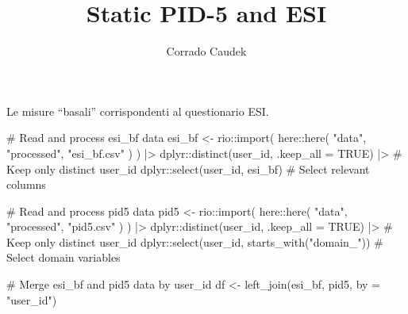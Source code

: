 \documentclass[
  11pt,
  a4paper,
  onecolumn]{article}
\title{Static PID-5 and ESI}
\author{Corrado Caudek}
\date{}
\newenvironment{Shaded}{}{}
\newcommand{\AttributeTok}[1]{\textcolor[rgb]{0.84,0.23,0.29}{#1}}
\newcommand{\CommentTok}[1]{\textcolor[rgb]{0.42,0.45,0.49}{#1}}
\newcommand{\ConstantTok}[1]{\textcolor[rgb]{0.00,0.36,0.77}{#1}}
\newcommand{\FunctionTok}[1]{\textcolor[rgb]{0.44,0.26,0.76}{#1}}
\newcommand{\NormalTok}[1]{\textcolor[rgb]{0.14,0.16,0.18}{#1}}
\newcommand{\OtherTok}[1]{\textcolor[rgb]{0.44,0.26,0.76}{#1}}
\newcommand{\SpecialCharTok}[1]{\textcolor[rgb]{0.00,0.36,0.77}{#1}}
\newcommand{\StringTok}[1]{\textcolor[rgb]{0.01,0.18,0.38}{#1}}
\begin{document}
\maketitle


Le misure ``basali'' corrispondenti al questionario ESI.

\begin{Shaded}
\begin{Highlighting}[]
\CommentTok{\# Read and process \textquotesingle{}esi\_bf\textquotesingle{} data}
\NormalTok{esi\_bf }\OtherTok{\textless{}{-}}\NormalTok{ rio}\SpecialCharTok{::}\FunctionTok{import}\NormalTok{(}
\NormalTok{  here}\SpecialCharTok{::}\FunctionTok{here}\NormalTok{(}
    \StringTok{"data"}\NormalTok{,}
    \StringTok{"processed"}\NormalTok{,}
    \StringTok{"esi\_bf.csv"}
\NormalTok{  )}
\NormalTok{) }\SpecialCharTok{|\textgreater{}}
\NormalTok{  dplyr}\SpecialCharTok{::}\FunctionTok{distinct}\NormalTok{(user\_id, }\AttributeTok{.keep\_all =} \ConstantTok{TRUE}\NormalTok{) }\SpecialCharTok{|\textgreater{}} \CommentTok{\# Keep only distinct user\_id}
\NormalTok{  dplyr}\SpecialCharTok{::}\FunctionTok{select}\NormalTok{(user\_id, esi\_bf) }\CommentTok{\# Select relevant columns}
\end{Highlighting}
\end{Shaded}

\begin{Shaded}
\begin{Highlighting}[]
\CommentTok{\# Read and process \textquotesingle{}pid5\textquotesingle{} data}
\NormalTok{pid5 }\OtherTok{\textless{}{-}}\NormalTok{ rio}\SpecialCharTok{::}\FunctionTok{import}\NormalTok{(}
\NormalTok{  here}\SpecialCharTok{::}\FunctionTok{here}\NormalTok{(}
    \StringTok{"data"}\NormalTok{,}
    \StringTok{"processed"}\NormalTok{,}
    \StringTok{"pid5.csv"}
\NormalTok{  )}
\NormalTok{) }\SpecialCharTok{|\textgreater{}}
\NormalTok{  dplyr}\SpecialCharTok{::}\FunctionTok{distinct}\NormalTok{(user\_id, }\AttributeTok{.keep\_all =} \ConstantTok{TRUE}\NormalTok{) }\SpecialCharTok{|\textgreater{}}  \CommentTok{\# Keep only distinct user\_id}
\NormalTok{  dplyr}\SpecialCharTok{::}\FunctionTok{select}\NormalTok{(user\_id, }\FunctionTok{starts\_with}\NormalTok{(}\StringTok{"domain\_"}\NormalTok{)) }\CommentTok{\# Select domain variables}

\CommentTok{\# Merge \textquotesingle{}esi\_bf\textquotesingle{} and \textquotesingle{}pid5\textquotesingle{} data by user\_id}
\NormalTok{df }\OtherTok{\textless{}{-}} \FunctionTok{left\_join}\NormalTok{(esi\_bf, pid5, }\AttributeTok{by =} \StringTok{"user\_id"}\NormalTok{)}
\end{Highlighting}
\end{Shaded}
\end{document}
